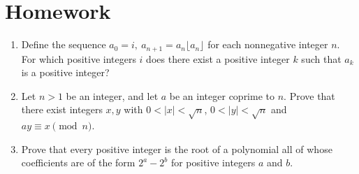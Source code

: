 \documentclass{article}
\begin{document}
\section{Homework}
  \begin{enumerate}
    \item Define the sequence $a_0=i,\ a_{n+1}=a_n\lfloor a_n\rfloor$ for each
      nonnegative integer $n$. For which positive integers $i$ does there exist a
      positive integer $k$ such that $a_k$ is a positive integer?
    \item Let $n>1$ be an integer, and let $a$ be an integer coprime to $n$. Prove
      that there exist integers $x,y$ with $0<|x|<\sqrt n$, $0<|y|<\sqrt n$ and
      $ay\equiv x\pmod n$.
    \item Prove that every positive integer is the root of a polynomial all of whose
      coefficients are of the form $2^a-2^b$ for positive integers $a$ and $b$.
  \end{enumerate}
\end{document}
